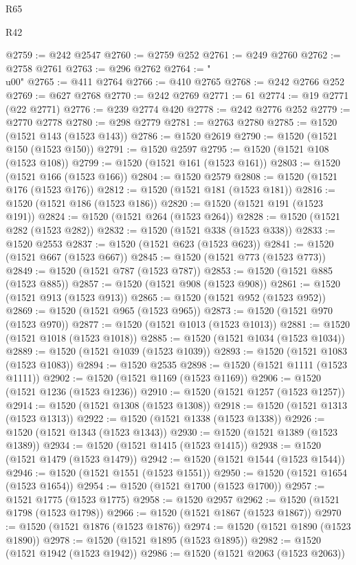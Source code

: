 \begin{lexlean}{R65}
\begin{lexlean}{R42}
\begin{coremodule}
{{{{{{{{{{{{{{{{{{{{{{{{{{{{{{{{{{{{{{{{{{{{{{{{{{{{{{{{{{{{{{{{{{{{{{{{{{{{{{{{{{{{{{{{{{{{{{{{{{{{{{{{{{{{{{{{{{{{{{{{{{{{{{{{{{{{{{{{{{{{{{{{{{{{{{{{{{{{{{{{{{{{{{{{{{{{{{{{{{{{{{{{@2759 := @242 @2547
@2760 := @2759 @252
@2761 := @249 @2760
@2762 := @2758 @2761
@2763 := @296 @2762
@2764 := "\\u00"
@2765 := @411 @2764
@2766 := @410 @2765
@2768 := @242 @2766 @252
@2769 := @627 @2768
@2770 := @242 @2769
@2771 := 61
@2774 := @19 @2771 (@22 @2771)
@2776 := @239 @2774 @420
@2778 := @242 @2776 @252
@2779 := @2770 @2778
@2780 := @298 @2779
@2781 := @2763 @2780
@2785 := @1520 (@1521 @143 (@1523 @143))
@2786 := @1520 @2619
@2790 := @1520 (@1521 @150 (@1523 @150))
@2791 := @1520 @2597
@2795 := @1520 (@1521 @108 (@1523 @108))
@2799 := @1520 (@1521 @161 (@1523 @161))
@2803 := @1520 (@1521 @166 (@1523 @166))
@2804 := @1520 @2579
@2808 := @1520 (@1521 @176 (@1523 @176))
@2812 := @1520 (@1521 @181 (@1523 @181))
@2816 := @1520 (@1521 @186 (@1523 @186))
@2820 := @1520 (@1521 @191 (@1523 @191))
@2824 := @1520 (@1521 @264 (@1523 @264))
@2828 := @1520 (@1521 @282 (@1523 @282))
@2832 := @1520 (@1521 @338 (@1523 @338))
@2833 := @1520 @2553
@2837 := @1520 (@1521 @623 (@1523 @623))
@2841 := @1520 (@1521 @667 (@1523 @667))
@2845 := @1520 (@1521 @773 (@1523 @773))
@2849 := @1520 (@1521 @787 (@1523 @787))
@2853 := @1520 (@1521 @885 (@1523 @885))
@2857 := @1520 (@1521 @908 (@1523 @908))
@2861 := @1520 (@1521 @913 (@1523 @913))
@2865 := @1520 (@1521 @952 (@1523 @952))
@2869 := @1520 (@1521 @965 (@1523 @965))
@2873 := @1520 (@1521 @970 (@1523 @970))
@2877 := @1520 (@1521 @1013 (@1523 @1013))
@2881 := @1520 (@1521 @1018 (@1523 @1018))
@2885 := @1520 (@1521 @1034 (@1523 @1034))
@2889 := @1520 (@1521 @1039 (@1523 @1039))
@2893 := @1520 (@1521 @1083 (@1523 @1083))
@2894 := @1520 @2535
@2898 := @1520 (@1521 @1111 (@1523 @1111))
@2902 := @1520 (@1521 @1169 (@1523 @1169))
@2906 := @1520 (@1521 @1236 (@1523 @1236))
@2910 := @1520 (@1521 @1257 (@1523 @1257))
@2914 := @1520 (@1521 @1308 (@1523 @1308))
@2918 := @1520 (@1521 @1313 (@1523 @1313))
@2922 := @1520 (@1521 @1338 (@1523 @1338))
@2926 := @1520 (@1521 @1343 (@1523 @1343))
@2930 := @1520 (@1521 @1389 (@1523 @1389))
@2934 := @1520 (@1521 @1415 (@1523 @1415))
@2938 := @1520 (@1521 @1479 (@1523 @1479))
@2942 := @1520 (@1521 @1544 (@1523 @1544))
@2946 := @1520 (@1521 @1551 (@1523 @1551))
@2950 := @1520 (@1521 @1654 (@1523 @1654))
@2954 := @1520 (@1521 @1700 (@1523 @1700))
@2957 := @1521 @1775 (@1523 @1775)
@2958 := @1520 @2957
@2962 := @1520 (@1521 @1798 (@1523 @1798))
@2966 := @1520 (@1521 @1867 (@1523 @1867))
@2970 := @1520 (@1521 @1876 (@1523 @1876))
@2974 := @1520 (@1521 @1890 (@1523 @1890))
@2978 := @1520 (@1521 @1895 (@1523 @1895))
@2982 := @1520 (@1521 @1942 (@1523 @1942))
@2986 := @1520 (@1521 @2063 (@1523 @2063))
}}}}}}}}}}}}}}}}}}}}}}}}}}}}}}}}}}}}}}}}}}}}}}}}}}}}}}}}}}}}}}}}}}}}}}}}}}}}}}}}}}}}}}}}}}}}}}}}}}}}}}}}}}}}}}}}}}}}}}}}}}}}}}}}}}}}}}}}}}}}}}}}}}}}}}}}}}}}}}}}}}}}}}}}}}}}}}}}}}}}}}}}
\end{coremodule}
\end{lexlean}
\end{lexlean}
